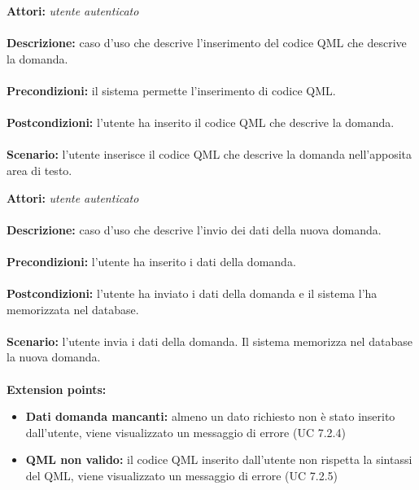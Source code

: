 \documentclass[a4paper,11pt]{article}
\begin{document}

\textbf{Attori:} \textit{utente autenticato}
\\ \\
\textbf{Descrizione:} caso d'uso che descrive l'inserimento del codice QML che descrive la domanda.\\
\\
\textbf{Precondizioni:} il sistema permette l'inserimento di codice QML.\\
\\
\textbf{Postcondizioni:} l’utente ha inserito il codice QML che descrive la domanda.\\
\\
\textbf{Scenario:} l’utente inserisce il codice QML che descrive la domanda nell'apposita area di testo.\\



\textbf{Attori:} \textit{utente autenticato}
\\ \\
\textbf{Descrizione:} caso d'uso che descrive l'invio dei dati della nuova domanda.\\
\\
\textbf{Precondizioni:} l'utente ha inserito i dati della domanda.\\
\\
\textbf{Postcondizioni:} l’utente ha inviato i dati della domanda e il sistema l'ha memorizzata nel database.\\
\\
\textbf{Scenario:} l’utente invia i dati della domanda. Il sistema memorizza nel database la nuova domanda.\\
\\
\textbf{Extension points:} 
\begin{itemize}
	\item \textbf{Dati domanda mancanti:} almeno un dato richiesto non è stato inserito dall'utente, viene visualizzato un messaggio di errore (UC 7.2.4)
	\item \textbf{QML non valido:} il codice QML inserito dall'utente non rispetta la sintassi del QML, viene visualizzato un messaggio di errore (UC 7.2.5)
\end{itemize}


\end{document}
